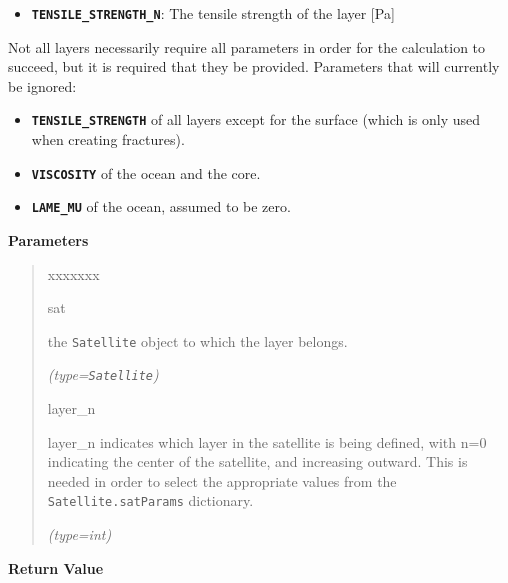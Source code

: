 \begin{boxedminipage}{\funcwidth}
\begin{itemize}
      \item \textbf{\texttt{TENSILE\_STRENGTH\_N}}: The tensile strength of the
        layer [Pa]

    \end{itemize}

    Not all layers necessarily require all parameters in order for the 
    calculation to succeed, but it is required that they be provided. 
    Parameters that will currently be ignored:

    \begin{itemize}
    \setlength{\parskip}{0.6ex}
      \item \textbf{\texttt{TENSILE\_STRENGTH}} of all layers except for the 
        surface (which is only used when creating fractures).

      \item \textbf{\texttt{VISCOSITY}} of the ocean and the core.

      \item \textbf{\texttt{LAME\_MU}} of the ocean, assumed to be zero.

    \end{itemize}

\setlength{\parskip}{1ex}
      \textbf{Parameters}
      \vspace{-1ex}

      \begin{quote}
        \begin{Ventry}{xxxxxxx}

          \item[sat]

          the \texttt{Satellite} object to which the layer belongs.

            {\it (type=\texttt{Satellite})}

          \item[layer\_n]

          layer\_n indicates which layer in the satellite is being defined,
          with n=0 indicating the center of the satellite, and increasing 
          outward.  This is needed in order to select the appropriate 
          values from the \texttt{Satellite.satParams} dictionary.

            {\it (type=int)}

        \end{Ventry}

      \end{quote}

      \textbf{Return Value}
    \vspace{-1ex}


\end{boxedminipage}
